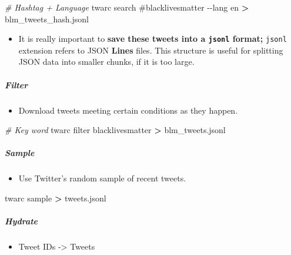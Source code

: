 \documentclass[
]{book}
\newenvironment{Shaded}{\begin{snugshade}}{\end{snugshade}}
\newcommand{\CommentTok}[1]{\textcolor[rgb]{0.56,0.35,0.01}{\textit{#1}}}
\newcommand{\ExtensionTok}[1]{#1}
\newcommand{\NormalTok}[1]{#1}
\newcommand{\OperatorTok}[1]{\textcolor[rgb]{0.81,0.36,0.00}{\textbf{#1}}}
\newcommand{\StringTok}[1]{\textcolor[rgb]{0.31,0.60,0.02}{#1}}
\providecommand{\tightlist}{%
  \setlength{\itemsep}{0pt}\setlength{\parskip}{0pt}}
\begin{document}
\begin{Shaded}
\begin{Highlighting}[]
\CommentTok{\# Hashtag + Language }
\ExtensionTok{twarc}\NormalTok{ search }\StringTok{\textquotesingle{}\#blacklivesmatter\textquotesingle{}}\NormalTok{ {-}{-}lang en }\OperatorTok{\textgreater{}}\NormalTok{ blm\_tweets\_hash.jsonl}
\end{Highlighting}
\end{Shaded}

\begin{itemize}
\tightlist
\item
  It is really important to \textbf{save these tweets into a \texttt{jsonl} format;} \texttt{jsonl} extension refers to JSON \textbf{Lines} files. This structure is useful for splitting JSON data into smaller chunks, if it is too large.
\end{itemize}

\hypertarget{filter}{%
\subparagraph{Filter}\label{filter}}

\begin{itemize}
\tightlist
\item
  Download tweets meeting certain conditions as they happen.
\end{itemize}

\begin{Shaded}
\begin{Highlighting}[]
\CommentTok{\# Key word}
\ExtensionTok{twarc}\NormalTok{ filter blacklivesmatter }\OperatorTok{\textgreater{}}\NormalTok{ blm\_tweets.jsonl}
\end{Highlighting}
\end{Shaded}

\hypertarget{sample}{%
\subparagraph{Sample}\label{sample}}

\begin{itemize}
\tightlist
\item
  Use Twitter's random sample of recent tweets.
\end{itemize}

\begin{Shaded}
\begin{Highlighting}[]
\ExtensionTok{twarc}\NormalTok{ sample }\OperatorTok{\textgreater{}}\NormalTok{ tweets.jsonl }
\end{Highlighting}
\end{Shaded}

\hypertarget{hydrate}{%
\subparagraph{Hydrate}\label{hydrate}}

\begin{itemize}
\tightlist
\item
  Tweet IDs -\textgreater{} Tweets
\end{itemize}
\end{document}
